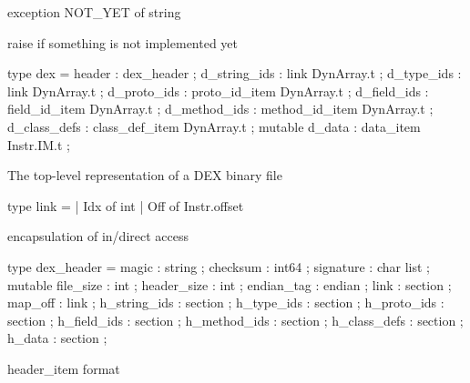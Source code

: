 \documentclass[11pt]{article}
\begin{document}
\label{exception:Dex.NOT-underscoreYET}\begin{ocamldoccode}
exception NOT_YET of string
\end{ocamldoccode}
\begin{ocamldocdescription}
raise if something is not implemented yet


\end{ocamldocdescription}




\label{type:Dex.dex}\begin{ocamldoccode}
type dex = {}
  header : dex_header ;
  d_string_ids : link DynArray.t ;
  d_type_ids : link DynArray.t ;
  d_proto_ids : proto_id_item DynArray.t ;
  d_field_ids : field_id_item DynArray.t ;
  d_method_ids : method_id_item DynArray.t ;
  d_class_defs : class_def_item DynArray.t ;
  mutable d_data : data_item Instr.IM.t ;
{}
\end{ocamldoccode}
\begin{ocamldocdescription}
The top-level representation of a DEX binary file


\end{ocamldocdescription}




\label{type:Dex.link}\begin{ocamldoccode}
type link =
  | Idx of int
  | Off of Instr.offset
\end{ocamldoccode}
\begin{ocamldocdescription}
encapsulation of in/direct access


\end{ocamldocdescription}




\label{type:Dex.dex-underscoreheader}\begin{ocamldoccode}
type dex_header = {}
  magic : string ;
  checksum : int64 ;
  signature : char list ;
  mutable file_size : int ;
  header_size : int ;
  endian_tag : endian ;
  link : section ;
  map_off : link ;
  h_string_ids : section ;
  h_type_ids : section ;
  h_proto_ids : section ;
  h_field_ids : section ;
  h_method_ids : section ;
  h_class_defs : section ;
  h_data : section ;
{}
\end{ocamldoccode}
\begin{ocamldocdescription}
header\_item format


\end{ocamldocdescription}
\end{document}
